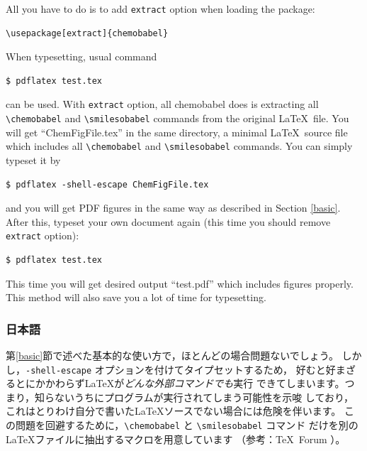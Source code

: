 \documentclass[dvipdfmx,12pt]{jsarticle}
\begin{document}
All you have to do is to add \verb|extract| option when loading the package:
\begin{verbatim}
\usepackage[extract]{chemobabel}
\end{verbatim}
When typesetting, usual command
\begin{verbatim}
$ pdflatex test.tex
\end{verbatim}
can be used. 
With \verb|extract| option, all \textsf{chemobabel} does is extracting
all \verb|\chemobabel| and \verb|\smilesobabel| commands from the
original \LaTeX\ file.
You will get ``ChemFigFile.tex'' in the same directory, a minimal
\LaTeX\ source file which includes all \verb|\chemobabel| and
\verb|\smilesobabel| commands.
You can simply typeset it by
\begin{verbatim}
$ pdflatex -shell-escape ChemFigFile.tex
\end{verbatim}
and you will get PDF figures in the same way
as described in Section \ref{basic}.
After this, typeset your own document again
(this time you should remove \verb|extract| option):
\begin{verbatim}
$ pdflatex test.tex
\end{verbatim}
This time you will get desired output ``test.pdf''
which includes figures properly.
This method will also save you a lot of time for typesetting.

\clearpage

\subsubsection{日本語}

第\ref{basic}節で述べた基本的な使い方で，ほとんどの場合問題ないでしょう。
しかし，\verb|-shell-escape| オプションを付けてタイプセットするため，
好むと好まざるとにかかわらず\LaTeX が\emph{どんな外部コマンドでも}実行
できてしまいます。つまり，知らないうちにプログラムが実行されてしまう可能性を示唆
しており，これはとりわけ自分で書いた\LaTeX ソースでない場合には危険を伴います。
この問題を回避するために，\verb|\chemobabel| と \verb|\smilesobabel| コマンド
だけを別の \LaTeX ファイルに抽出するマクロを用意しています
（参考：\TeX\ Forum \cite{OKU}）。
\end{document}
